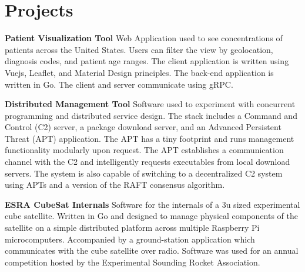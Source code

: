\documentclass[letterpaper,12pt]{article}
\newcommand{\resumeItem}[1]{
  \item\small{
      {#1 \vspace{-2pt}}
  }
}
\newcommand{\resumeSubItem}[2]{\resumeItem{#1}{#2}\vspace{-4pt}}
\newcommand{\resumeSubHeadingListStart}{\begin{description}[leftmargin=*]}
\newcommand{\resumeSubHeadingListEnd}{\end{description}}
\begin{document}
\section{Projects}
\resumeSubHeadingListStart
    \resumeSubItem
    {\textbf{Patient Visualization Tool}}
    {Web Application used to see concentrations of patients across the United States.
    Users can filter the view by geolocation, diagnosis codes, and patient age ranges.
    The client application is written using Vuejs, Leaflet, and Material Design principles.
    The back-end application is written in Go.
    The client and server communicate using gRPC.}
    \resumeSubItem
    {\textbf{Distributed Management Tool}}
    {Software used to experiment with concurrent programming and distributed service design.
    The stack includes a Command and Control (C2) server, a package download server, and an Advanced Persistent Threat (APT) application.
    The APT has a tiny footprint and runs management functionality modularly upon request.
    The APT establishes a communication channel with the C2 and intelligently requests executables from local download servers.
    The system is also capable of switching to a decentralized C2 system using APTs and a version of the RAFT consensus algorithm.}
    \resumeSubItem
    {\textbf{ESRA CubeSat Internals}}
    {Software for the internals of a 3u sized experimental cube satellite.
    Written in Go and designed to manage physical components of the satellite on a simple distributed platform across multiple Raspberry Pi microcomputers.
    Accompanied by a ground-station application which communicates with the cube satellite over radio.
    Software was used for an annual competition hosted by the Experimental Sounding Rocket Association.}
\resumeSubHeadingListEnd


\end{document}
